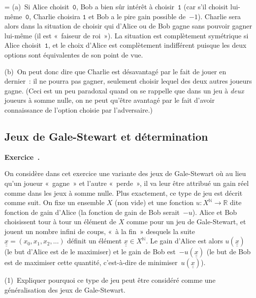 \documentclass[12pt,a4paper]{article}
\theoremstyle{definition}
\newcommand\exercice{%
\refstepcounter{comcnt}\bigskip\noindent\textbf{Exercice~\thecomcnt.}\par\nobreak}
\newcommand{\dblunderline}[1]{\underline{\underline{#1}}}
\newif\ifcorrige
\newenvironment{corrige}%
{\ifcorrige\relax\else\setbox0=\vbox\bgroup\fi%
\smallbreak\noindent{\underbar{\textit{Corrigé.}}\quad}}
{{\hbox{}\nobreak\hfill\checkmark}%
\ifcorrige\relax\else\egroup\fi\par}
\begin{document}
\begin{corrige}
(a) Si Alice choisit $\mathtt{0}$, Bob a bien sûr intérêt à
  choisir $\mathtt{1}$ (car s'il choisit lui-même $\mathtt{0}$,
  Charlie choisira $\mathtt{1}$ et Bob a le pire gain possible
  de $-1$).  Charlie sera alors dans la situation de choisir qui
  d'Alice ou de Bob gagne sans pouvoir gagner lui-même (il est
  « faiseur de roi »).  La situation est complètement symétrique si
  Alice choisit $\mathtt{1}$, et le choix d'Alice est complètement
  indifférent puisque les deux options sont équivalentes de son point
  de vue.

(b) On peut donc dire que Charlie est désavantagé par le fait de jouer
  en dernier : il ne pourra pas gagner, seulement choisir lequel des
  deux autres joueurs gagne.  (Ceci est un peu paradoxal quand on se
  rappelle que dans un jeu à \emph{deux} joueurs à somme nulle, on ne
  peut qu'être avantagé par le fait d'avoir connaissance de l'option
  choisie par l'adversaire.)
\end{corrige}

%
%
%

\subsection{Jeux de Gale-Stewart et détermination}

\exercice

On considère dans cet exercice une variante des jeux de Gale-Stewart
où au lieu qu'un joueur « gagne » et l'autre « perde », il va leur
être attribué un gain réel comme dans les jeux à somme nulle.  Plus
exactement, ce type de jeu est décrit comme suit.  On fixe un ensemble
$X$ (non vide) et une fonction $u \colon X^{\mathbb{N}} \to
\mathbb{R}$ dite fonction de gain d'Alice (la fonction de gain de Bob
serait $-u$).  Alice et Bob choisissent tour à tour un élément de $X$
comme pour un jeu de Gale-Stewart, et jouent un nombre infini de
coups, « à la fin » desquels la suite $\dblunderline{x} =
(x_0,x_1,x_2,\ldots)$ définit un élément $\dblunderline{x} \in
X^{\mathbb{N}}$.  Le gain d'Alice est alors $u(\dblunderline{x})$ (le but
d'Alice est de le maximiser) et le gain de Bob est $-u(\dblunderline{x})$
(le but de Bob est de maximiser cette quantité, c'est-à-dire de
minimiser $u(\dblunderline{x})$).

\smallbreak

(1) Expliquer pourquoi ce type de jeu peut être considéré comme une
généralisation des jeux de Gale-Stewart.
\end{document}
